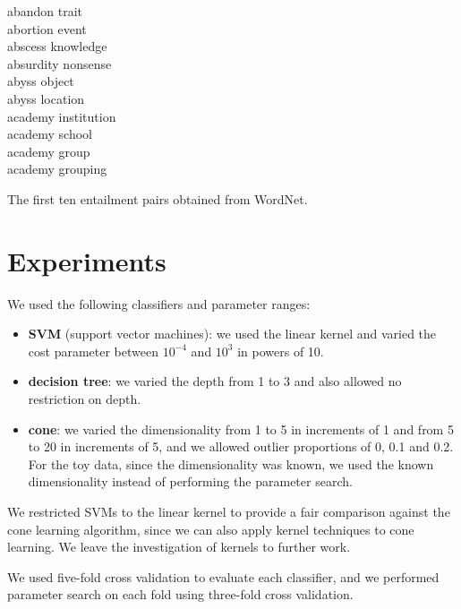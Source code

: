 \begin{table}
\begin{center}
\begin{minipage}{4cm}
abandon trait\\
abortion event\\
abscess knowledge\\
absurdity nonsense\\
abyss object\\
abyss location\\
academy institution\\
academy school\\
academy group\\
academy grouping\\
\end{minipage}
\end{center}
\caption{The first ten entailment pairs obtained from WordNet.}
\label{table:pairs}
\end{table}

\section{Experiments}

We used the following classifiers and parameter ranges:
\begin{itemize}
\item \textbf{SVM} (support vector machines): we used the linear
  kernel and varied the cost parameter between $10^{-4}$ and $10^{3}$
  in powers of 10.
\item \textbf{decision tree}: we varied the depth from 1 to 3 and also
  allowed no restriction on depth.
\item \textbf{cone}: we varied the dimensionality from 1 to 5 in
  increments of 1 and from 5 to 20 in increments of 5, and we allowed
  outlier proportions of 0, 0.1 and 0.2. For the toy data, since the
  dimensionality was known, we used the known dimensionality instead
  of performing the parameter search.
\end{itemize}
We restricted SVMs to the linear kernel to provide a fair comparison
against the cone learning algorithm, since we can also apply kernel
techniques to cone learning. We leave the investigation of kernels to
further work.

We used five-fold cross validation to evaluate each classifier, and we
performed parameter search on each fold using three-fold cross
validation.

